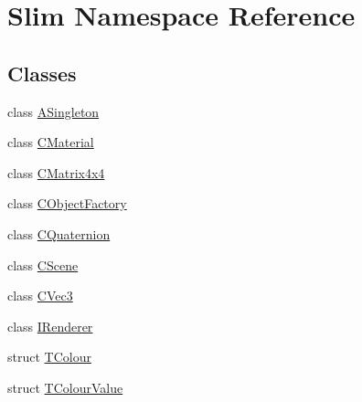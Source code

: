 \hypertarget{namespace_slim}{}\section{Slim Namespace Reference}
\label{namespace_slim}
\subsection*{Classes}
\begin{DoxyCompactItemize}
\item 
class \hyperlink{class_slim_1_1_a_singleton}{A\+Singleton}
\item 
class \hyperlink{class_slim_1_1_c_material}{C\+Material}
\item 
class \hyperlink{class_slim_1_1_c_matrix4x4}{C\+Matrix4x4}
\item 
class \hyperlink{class_slim_1_1_c_object_factory}{C\+Object\+Factory}
\item 
class \hyperlink{class_slim_1_1_c_quaternion}{C\+Quaternion}
\item 
class \hyperlink{class_slim_1_1_c_scene}{C\+Scene}
\item 
class \hyperlink{class_slim_1_1_c_vec3}{C\+Vec3}
\item 
class \hyperlink{class_slim_1_1_i_renderer}{I\+Renderer}
\item 
struct \hyperlink{struct_slim_1_1_t_colour}{T\+Colour}
\item 
struct \hyperlink{struct_slim_1_1_t_colour_value}{T\+Colour\+Value}
\end{DoxyCompactItemize}
